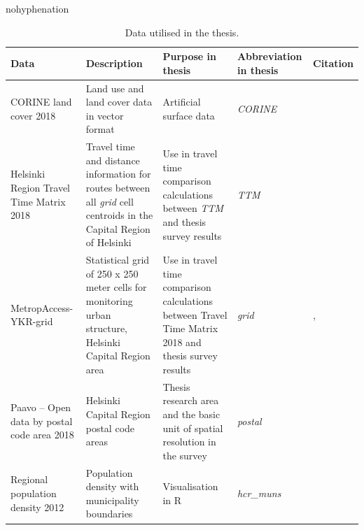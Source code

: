 \begin{hyphenrules}{nohyphenation}
    \begin{table}[H]
        \centering
        \caption[Thesis data]{Data utilised in the thesis.} 
        \label{tab:used_data}
        \scalebox{0.8}
        {\def\arraystretch{1.5} 
        \setlength\tabcolsep{1.2ex}
        \begin{tabular}{ @{} >{\raggedright\arraybackslash}p{4cm} >{\raggedright\arraybackslash}p{4cm} >{\raggedright\arraybackslash}p{4.5cm} >{\raggedright\arraybackslash}p{3.5cm} >{\raggedleft\arraybackslash}p{3.5cm} @{} }
            \toprule
            Data & Description & Purpose in thesis & Abbreviation in thesis & Citation \\
            \midrule
            CORINE land cover 2018 & Land use and land cover data in vector format & Artificial surface data & \textit{CORINE} & \cite{FinnishEnvironmentInstitute2018} \\
            Helsinki Region Travel Time Matrix 2018 & Travel time and distance information for routes between all \textit{grid} cell centroids in the Capital Region of Helsinki & Use in travel time comparison calculations between \textit{TTM} and thesis survey results & \textit{TTM} & \cite{Tenkanen2018} \\
            MetropAccess-YKR-grid & Statistical grid of 250 x 250 meter cells for monitoring urban structure, Helsinki Capital Region area & Use in travel time comparison calculations between Travel Time Matrix 2018 and thesis survey results & \textit{grid} & \cite{Toivonen2014a}, \cite{StatisticsFinland2020} \\
            Paavo -- Open data by postal code area 2018 & Helsinki Capital Region postal code areas & Thesis research area and the basic unit of spatial resolution in the survey & \textit{postal} & \cite{StatisticsFinland2019a} \\
            Regional population density 2012 & Population density with municipality boundaries & Visualisation in R & \textit{hcr\_muns} & \cite{StatisticsFinland2012} \\

\end{tabular}}
\end{table}
\end{hyphenrules}
